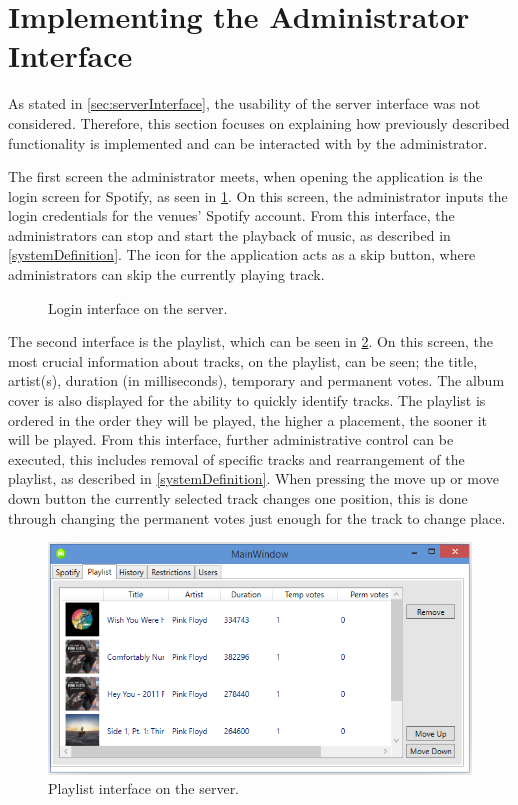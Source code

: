 \section{Implementing the Administrator Interface}\label{sec:impinterface}
As stated in \cref{sec:serverInterface}, the usability of the server interface was not considered. Therefore, this section focuses on explaining how previously described functionality is implemented and can be interacted with by the administrator.

The first screen the administrator meets, when opening the application is the login screen for Spotify, as seen in \cref{fig:loginInterface}. On this screen, the administrator inputs the login credentials for the venues' Spotify account. From this interface, the administrators can stop and start the playback of music, as described in \cref{systemDefinition}. The icon for the application acts as a skip button, where administrators can skip the currently playing track.

\begin{figure}[H]
  \centering
  \caption{Login interface on the server.}\label{fig:loginInterface}
\end{figure}

The second interface is the playlist, which can be seen in \cref{fig:ServerInterfacePlaylist}. On this screen, the most crucial information about tracks, on the playlist, can be seen; the title, artist(s), duration (in milliseconds), temporary and permanent votes. The album cover is also displayed for the ability to quickly identify tracks. The playlist is ordered in the order they will be played, the higher a placement, the sooner it will be played. From this interface, further administrative control can be executed, this includes removal of specific tracks and rearrangement of the playlist, as described in \cref{systemDefinition}. When pressing the move up or move down button the currently selected track changes one position, this is done through changing the permanent votes just enough for the track to change place.

\begin{figure}[hbtp]
  \centering
  \includegraphics[width=\textwidth]{Images/ServerInterfacePlaylist.png}
  \caption{Playlist interface on the server.}\label{fig:ServerInterfacePlaylist}
\end{figure}

